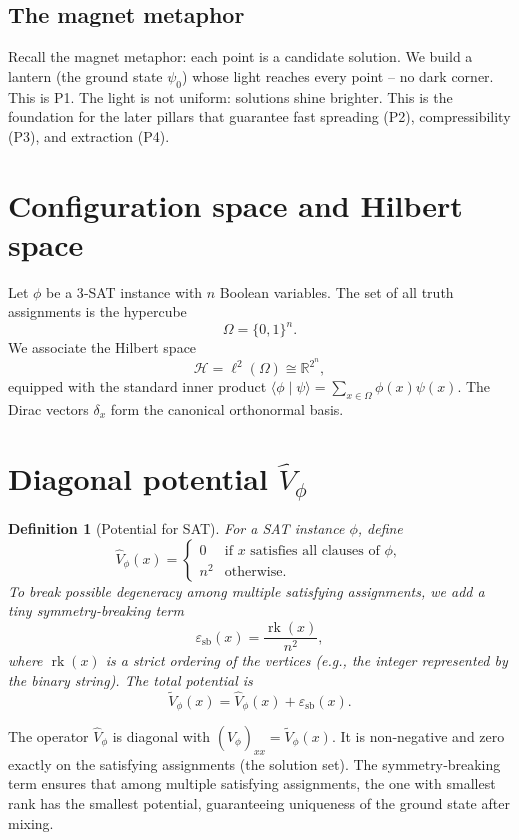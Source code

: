 \documentclass[11pt,a4paper]{article}
\newtheorem{definition}[theorem]{Definition}
\begin{document}
\subsection{The magnet metaphor}

Recall the magnet metaphor: each point is a candidate solution. We build a lantern (the ground state $\psi_0$) whose light reaches every point – no dark corner. This is P1. The light is not uniform: solutions shine brighter. This is the foundation for the later pillars that guarantee fast spreading (P2), compressibility (P3), and extraction (P4).

\section{Configuration space and Hilbert space}

Let $\phi$ be a 3‑SAT instance with $n$ Boolean variables. The set of all truth assignments is the hypercube
\[
\Omega = \{0,1\}^n.
\]
We associate the Hilbert space
\[
\mathcal{H} = \ell^2(\Omega) \cong \mathbb{R}^{2^n},
\]
equipped with the standard inner product $\langle \phi \mid \psi \rangle = \sum_{x\in\Omega} \phi(x)\psi(x)$. The Dirac vectors $\delta_x$ form the canonical orthonormal basis.

\section{Diagonal potential $\hat{V}_\phi$}

\begin{definition}[Potential for SAT]
For a SAT instance $\phi$, define
\[
\hat{V}_\phi(x) = 
\begin{cases}
0 & \text{if } x \text{ satisfies all clauses of } \phi,\\
n^2 & \text{otherwise}.
\end{cases}
\]
To break possible degeneracy among multiple satisfying assignments, we add a tiny symmetry‑breaking term
\[
\varepsilon_{\text{sb}}(x) = \frac{\operatorname{rk}(x)}{n^2},
\]
where $\operatorname{rk}(x)$ is a strict ordering of the vertices (e.g., the integer represented by the binary string). The total potential is
\[
\tilde{V}_\phi(x) = \hat{V}_\phi(x) + \varepsilon_{\text{sb}}(x).
\]
\end{definition}

The operator $\hat{V}_\phi$ is diagonal with $(\hat{V}_\phi)_{xx} = \tilde{V}_\phi(x)$. It is non‑negative and zero exactly on the satisfying assignments (the solution set). The symmetry‑breaking term ensures that among multiple satisfying assignments, the one with smallest rank has the smallest potential, guaranteeing uniqueness of the ground state after mixing.
\end{document}
